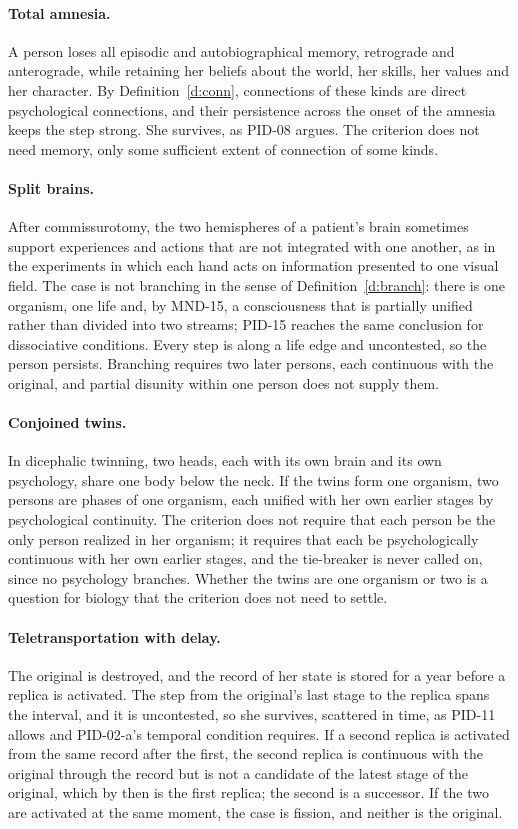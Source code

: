 \documentclass{situationist-preprint}
\begin{document}
\paragraph{Total amnesia.} A person loses all episodic and autobiographical memory, retrograde and anterograde, while retaining her beliefs about the world, her skills, her values and her character. By Definition~\ref{d:conn}, connections of these kinds are direct psychological connections, and their persistence across the onset of the amnesia keeps the step strong. She survives, as PID-08 argues. The criterion does not need memory, only some sufficient extent of connection of some kinds.

\paragraph{Split brains.} After commissurotomy, the two hemispheres of a patient's brain sometimes support experiences and actions that are not integrated with one another, as in the experiments in which each hand acts on information presented to one visual field. The case is not branching in the sense of Definition~\ref{d:branch}: there is one organism, one life and, by MND-15, a consciousness that is partially unified rather than divided into two streams; PID-15 reaches the same conclusion for dissociative conditions. Every step is along a life edge and uncontested, so the person persists. Branching requires two later persons, each continuous with the original, and partial disunity within one person does not supply them.

\paragraph{Conjoined twins.} In dicephalic twinning, two heads, each with its own brain and its own psychology, share one body below the neck. If the twins form one organism, two persons are phases of one organism, each unified with her own earlier stages by psychological continuity. The criterion does not require that each person be the only person realized in her organism; it requires that each be psychologically continuous with her own earlier stages, and the tie-breaker is never called on, since no psychology branches. Whether the twins are one organism or two is a question for biology that the criterion does not need to settle.

\paragraph{Teletransportation with delay.} The original is destroyed, and the record of her state is stored for a year before a replica is activated. The step from the original's last stage to the replica spans the interval, and it is uncontested, so she survives, scattered in time, as PID-11 allows and PID-02-a's temporal condition requires. If a second replica is activated from the same record after the first, the second replica is continuous with the original through the record but is not a candidate of the latest stage of the original, which by then is the first replica; the second is a successor. If the two are activated at the same moment, the case is fission, and neither is the original.
\end{document}
